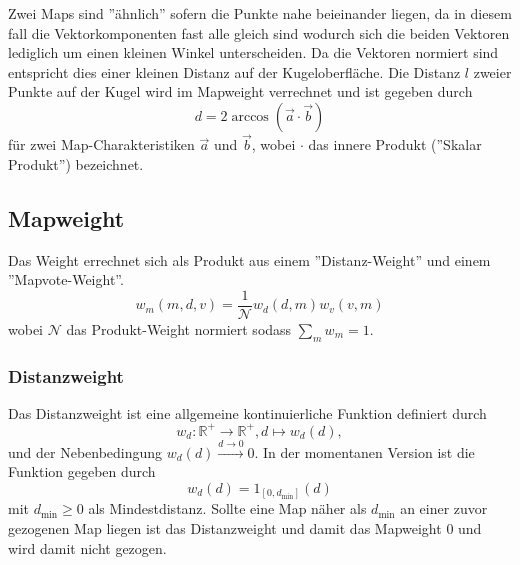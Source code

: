     Zwei Maps sind ''ähnlich'' sofern die Punkte nahe beieinander liegen, da in diesem fall die Vektorkomponenten fast alle gleich sind wodurch sich die beiden Vektoren lediglich um einen kleinen Winkel unterscheiden.
    Da die Vektoren normiert sind entspricht dies einer kleinen Distanz auf der Kugeloberfläche.
    Die Distanz $l$ zweier Punkte auf der Kugel wird im Mapweight verrechnet und ist gegeben durch 
    \begin{equation}
        d = 2\arccos(\vec{a}\cdot\vec{b})
    \end{equation}
    für zwei Map-Charakteristiken $\vec{a}$ und $\vec{b}$, wobei $\cdot$ das innere Produkt (''Skalar Produkt'') bezeichnet. 
    \subsection{Mapweight}
    Das Weight errechnet sich als Produkt aus einem ''Distanz-Weight'' und einem ''Mapvote-Weight''. 
    \begin{equation}
        w_m(m,d,v) = \frac{1}{\mathcal{N}}w_d(d,m)w_v(v,m)
    \end{equation}
    wobei $\mathcal{N}$ das Produkt-Weight normiert sodass $\sum_m w_m = 1$.
    \subsubsection{Distanzweight}
        Das Distanzweight ist eine allgemeine kontinuierliche Funktion definiert durch
        \begin{equation}
            w_d : \mathbb{R}^+ \rightarrow \mathbb{R}^+, d \mapsto w_d(d),
        \end{equation}
        und der Nebenbedingung $w_d(d)\overset{d\rightarrow 0}{\longrightarrow}0$.
        In der momentanen Version ist die Funktion gegeben durch
        \begin{equation}
            w_d(d) = 1_{[0,d_\text{min}]}(d)
        \end{equation}
        mit $d_\text{min}\geq 0$ als Mindestdistanz. 
        Sollte eine Map näher als $d_\text{min}$ an einer zuvor gezogenen Map liegen ist das Distanzweight und damit das Mapweight $0$ und wird damit nicht gezogen. 
